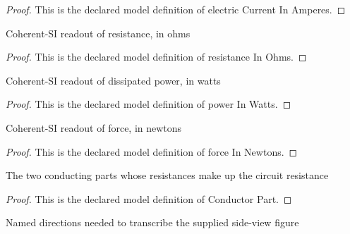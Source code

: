\begin{proof}
  This is the declared model definition of electric Current In Amperes.
\end{proof}
\begin{definition}
  \label{def:physics:phyx-mini-0919:phyxminiproblems-problemphyxmini0919-resistanceinohms}
  Coherent-SI readout of resistance, in ohms
\end{definition}
\begin{proof}
  This is the declared model definition of resistance In Ohms.
\end{proof}
\begin{definition}
  \label{def:physics:phyx-mini-0919:phyxminiproblems-problemphyxmini0919-powerinwatts}
  Coherent-SI readout of dissipated power, in watts
\end{definition}
\begin{proof}
  This is the declared model definition of power In Watts.
\end{proof}
\begin{definition}
  \label{def:physics:phyx-mini-0919:phyxminiproblems-problemphyxmini0919-forceinnewtons}
  Coherent-SI readout of force, in newtons
\end{definition}
\begin{proof}
  This is the declared model definition of force In Newtons.
\end{proof}
\begin{definition}
  \label{def:physics:phyx-mini-0919:phyxminiproblems-problemphyxmini0919-conductorpart}
  The two conducting parts whose resistances make up the circuit resistance
\end{definition}
\begin{proof}
  This is the declared model definition of Conductor Part.
\end{proof}
\begin{definition}
  \label{def:physics:phyx-mini-0919:phyxminiproblems-problemphyxmini0919-spatialdirection}
  Named directions needed to transcribe the supplied side-view figure
\end{definition}
